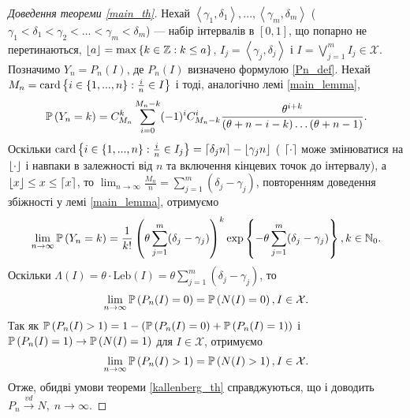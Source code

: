 \begin{proof}[Доведення теореми \ref{main_th}]\label{main_proof}
    Нехай $\left<\gamma_1, \delta_1 \right>, ..., \left<\gamma_m, \delta_m \right>$ 
    ($\gamma_1 < \delta_1 < \gamma_2 < ... < \gamma_m < \delta_m$) --- 
    набір інтервалів в $[0, 1]$, що попарно не перетинаються, 
    $\floor*{a} = \max\left\{k\in\Z : k \leq a\right\}$,
    $I_j = \left<\gamma_j, \delta_j\right>$ і $I = \bigvee_{j=1}^m I_j \in \mathcal{X}$.
    Позначимо $Y_n = P_n (I)$, де $P_n(I)$ визначено формулою \eqref{Pn_def}.
    Нехай $M_n = \card \left\{ 
        i \in \{1, ..., n\} : \frac{i}{n} \in I
    \right\}$ і тоді, аналогічно лемі \ref{main_lemma},
    \begin{gather*}
        \P{Y_n = k} = C_{M_n}^k \sum_{i=0}^{M_n-k}(-1)^{i} C_{M_n-k}^{i} \frac{\theta^{i+k}}{
            (\theta + n - i - k) \dots (\theta + n - 1)
        }.
    \end{gather*}
    Оскільки 
    $\card \left\{ 
        i \in \{1, ..., n\} : \frac{i}{n} \in I_j
    \right\} = \ceil*{\delta_j n} - \floor*{\gamma_j n}$ (
        $\ceil*{\cdot}$ може змінюватися на $\floor*{\cdot}$ і навпаки
        в залежності від $n$ та включення кінцевих точок до інтервалу), а $\floor*{x} \leq x \leq \ceil*{x}$, то
    $\lim_{n\to\infty}\frac{M_n}{n} = \sum_{j=1}^m (\delta_j - \gamma_j)$,
    повторенням доведення збіжності у лемі \ref{main_lemma},
    отримуємо
    \begin{gather*}
            \lim_{n\to\infty}\P{Y_n = k} = 
            \frac{1}{k!} \left(
                \theta \sum_{j=1}^m (\delta_j - \gamma_j)
            \right)^k
            \exp\left\{ 
                -\theta \sum_{j=1}^m (\delta_j - \gamma_j)
            \right\}, k \in \N_0.
    \end{gather*}
    Оскільки $\Lambda(I) = \theta \cdot \mathrm{Leb}(I) = \theta \sum_{j=1}^m (\delta_j - \gamma_j)$,
    то
    \begin{gather*}
        \lim_{n\to\infty}\P{P_n(I) = 0} = \P{N(I) = 0}, I\in\mathcal{X}.
    \end{gather*}
    Так як $\P{P_n(I) > 1} = 1 - \left(
        \P{P_n(I) = 0} + \P{P_n(I) = 1}
    \right)$ і $\P{P_n(I) = 1} \to \P{N(I) = 1}$ для $I\in\mathcal{X}$,
    отримуємо 
    \begin{gather*}
        \lim_{n\to\infty}\P{P_n(I) > 1} = \P{N(I) > 1}, I\in\mathcal{X}.
    \end{gather*}
    Отже, обидві умови теореми \ref{kallenberg_th} справджуються, що і доводить
    $P_n \overset{vd}{\longrightarrow} N, \; n\to\infty$.
\end{proof}

